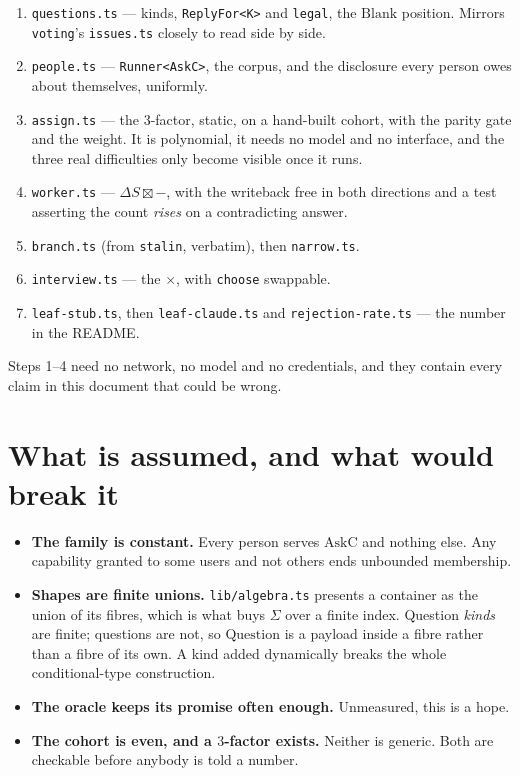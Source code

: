 \documentclass[11pt,a4paper]{article}
\newcommand{\ten}{\mathbin{\boxtimes}}
\newcommand{\AskC}{\mathrm{AskC}}
\newcommand{\Question}{\mathrm{Question}}
\begin{document}
\begin{enumerate}
\item \texttt{questions.ts} --- kinds, \texttt{ReplyFor<K>} and \texttt{legal},
  the $\mathrm{Blank}$ position. Mirrors \texttt{voting}'s \texttt{issues.ts} closely
  to read side by side.
\item \texttt{people.ts} --- \texttt{Runner<AskC>}, the corpus, and the
  disclosure every person owes about themselves, uniformly.
\item \texttt{assign.ts} --- the $3$-factor, static, on a hand-built cohort, with
  the parity gate and the weight. It is polynomial, it needs no model and no
  interface, and the three real difficulties only become visible once it runs.
\item \texttt{worker.ts} --- $\Delta S \ten -$, with the writeback free in both
  directions and a test asserting the count \emph{rises} on a contradicting
  answer.
\item \texttt{branch.ts} (from \texttt{stalin}, verbatim), then
  \texttt{narrow.ts}.
\item \texttt{interview.ts} --- the $\times$, with \texttt{choose} swappable.
\item \texttt{leaf-stub.ts}, then \texttt{leaf-claude.ts} and
  \texttt{rejection-rate.ts} --- the number in the README.
\end{enumerate}

Steps 1--4 need no network, no model and no credentials, and they contain every
claim in this document that could be wrong.

\section{What is assumed, and what would break it}

\begin{itemize}
\item \textbf{The family is constant.} Every person serves $\AskC$ and nothing
  else. Any capability granted to some users and not others ends unbounded
  membership.
\item \textbf{Shapes are finite unions.} \texttt{lib/algebra.ts} presents a
  container as the union of its fibres, which is what buys $\Sigma$ over a finite
  index. Question \emph{kinds} are finite; questions are not, so $\Question$ is a
  payload inside a fibre rather than a fibre of its own. A kind added
  dynamically breaks the whole conditional-type construction.
\item \textbf{The oracle keeps its promise often enough.} Unmeasured, this is a
  hope.
\item \textbf{The cohort is even, and a $3$-factor exists.} Neither is generic.
  Both are checkable before anybody is told a number.
\end{itemize}
\end{document}
